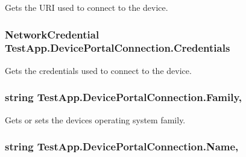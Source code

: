 Gets the U\+RI used to connect to the device. 

\subsubsection[{\texorpdfstring{Credentials}{Credentials}}]{\setlength{\rightskip}{0pt plus 5cm}Network\+Credential Test\+App.\+Device\+Portal\+Connection.\+Credentials\hspace{0.3cm}{\ttfamily [get]}}\hypertarget{class_test_app_1_1_device_portal_connection_acc72ff8c7730a85d2eb1e2d5d69c6e80}{}\label{class_test_app_1_1_device_portal_connection_acc72ff8c7730a85d2eb1e2d5d69c6e80}


Gets the credentials used to connect to the device. 

\subsubsection[{\texorpdfstring{Family}{Family}}]{\setlength{\rightskip}{0pt plus 5cm}string Test\+App.\+Device\+Portal\+Connection.\+Family\hspace{0.3cm}{\ttfamily [get]}, {\ttfamily [set]}}\hypertarget{class_test_app_1_1_device_portal_connection_a222d1725e3d694163cdca1a1b8062a16}{}\label{class_test_app_1_1_device_portal_connection_a222d1725e3d694163cdca1a1b8062a16}


Gets or sets the device\textquotesingle{}s operating system family. 

\subsubsection[{\texorpdfstring{Name}{Name}}]{\setlength{\rightskip}{0pt plus 5cm}string Test\+App.\+Device\+Portal\+Connection.\+Name\hspace{0.3cm}{\ttfamily [get]}, {\ttfamily [set]}}\hypertarget{class_test_app_1_1_device_portal_connection_ad1850496ae65e81a106bf94c1aaa83a2}{}\label{class_test_app_1_1_device_portal_connection_ad1850496ae65e81a106bf94c1aaa83a2}


